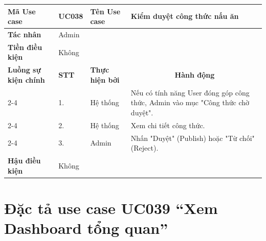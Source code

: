 \begin{longtable}{|p{2.7cm}|p{0.8cm}|p{2.6cm}|p{7.3cm}|}
\hline
\cellcolor[HTML]{D5F5E3}\textbf{Mã Use case} & \multicolumn{1}{l|}{UC038} & \cellcolor[HTML]{D5F5E3}\textbf{Tên Use case} & Kiểm duyệt công thức nấu ăn \\ \hline
\cellcolor[HTML]{D5F5E3}\textbf{Tác nhân} & \multicolumn{3}{p{10.7cm}|}{Admin} \\ \hline
\cellcolor[HTML]{D5F5E3}\textbf{Tiền điều kiện} & \multicolumn{3}{p{10.7cm}|}{Không} \\ \hline

\cellcolor[HTML]{D5F5E3}\textbf{Luồng sự kiện chính} & \cellcolor[HTML]{FDEBD0}\textbf{STT} & \cellcolor[HTML]{FDEBD0}\textbf{Thực hiện bởi} & \multicolumn{1}{c|}{\cellcolor[HTML]{FDEBD0}\textbf{Hành động}} \\ \cline{2-4} 
\cellcolor[HTML]{D5F5E3} & 1. & Hệ thống & Nếu có tính năng User đóng góp công thức, Admin vào mục "Công thức chờ duyệt". \\ \cline{2-4} 
\cellcolor[HTML]{D5F5E3} & 2. & Hệ thống & Xem chi tiết công thức. \\ \cline{2-4} 
\cellcolor[HTML]{D5F5E3} & 3. & Admin & Nhấn "Duyệt" (Publish) hoặc "Từ chối" (Reject). \\ \hline

\cellcolor[HTML]{D5F5E3}\textbf{Hậu điều kiện} & \multicolumn{3}{p{10.7cm}|}{Không} \\ \hline
\end{longtable}
\endgroup

\section{Đặc tả use case UC039 ``Xem Dashboard tổng quan''}
\vspace{0.5cm}

\begingroup
\renewcommand{\arraystretch}{1.5}

